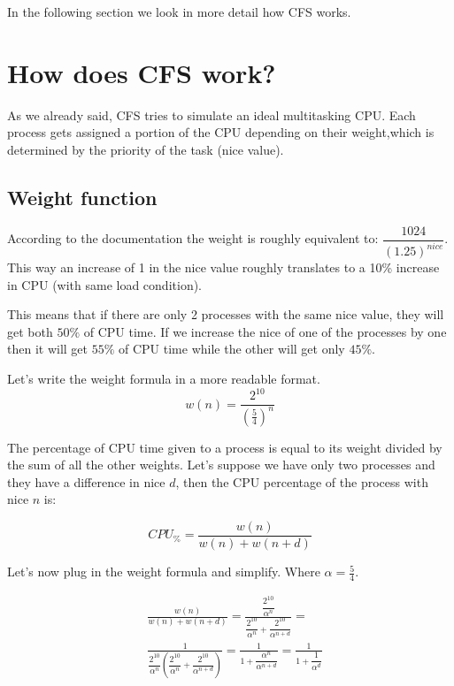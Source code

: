 \documentclass[10pt]{book}
\begin{document}
In the following section we look in more detail how CFS works.

\section{How does CFS work?} 

As we already said, CFS tries to simulate an ideal multitasking CPU. Each process gets assigned a portion of the CPU depending on their weight,which is determined by the priority of the task (nice value).

\subsection{Weight function}
According to the documentation the weight is roughly equivalent to: $\dfrac{1024}{(1.25)^{nice}}$. This way an increase of 1 in the nice value roughly translates to a 10\% increase in CPU (with same load condition).%

This means that if there are only 2 processes with the same nice value, they will get both $50\%$ of CPU time. If we increase the nice of one of the processes by one then it will get $55\%$ of CPU time while the other will get only $45\%$.


Let's write the weight formula in a more readable format.
\begin{equation}
    w(n) = \frac{2^{10}}{(\frac{5}{4})^{n}}
\end{equation}

The percentage of CPU time given to a process is equal to its weight divided by the sum of all the other weights. Let's suppose we have only two processes and they have a difference in nice $d$, then the CPU percentage of the process with nice $n$ is:

\begin{equation}
    CPU_\% = \frac{w(n)}{w(n)+w(n+d)}
\end{equation}

Let's now plug in the weight formula and simplify. Where $\alpha=\frac{5}{4}$. 

\begin{align*}
    &\frac{w(n)}{w(n)+w(n+d)} =
    \frac{\dfrac{2^{10}}{\alpha^{n}}}{\dfrac{2^{10}}{\alpha^{n}}+\dfrac{2^{10}}{\alpha^{n+d}}} =\\
    &\frac{1}{\dfrac{2^{10}}{\alpha^{n}} \left(\dfrac{2^{10}}{\alpha^{n}}+\dfrac{2^{10}}{\alpha^{n+d}}\right)} =
    \frac{1}{1+\dfrac{\alpha^{n}}{\alpha^{n+d}}} =
    \frac{1}{1+\dfrac{1}{\alpha^{d}}}
\end{align*}
\end{document}
